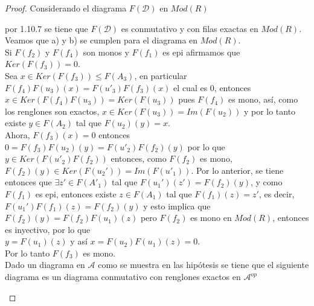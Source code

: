 \documentclass{article}
\begin{document}
\begin{enumerate}[label=\textbf{Ej \arabic*.}]
\begin{proof}
Considerando el diagrama $F(\mathscr{D})$ en $Mod(R)$

\centerline{
}

por 1.10.7 se tiene que $F(\mathscr{D})$ es conmutativo y con filas exactas en $Mod(R)$.\\
Veamos que a) y b) se cumplen para el diagrama en $Mod(R)$.\\

 Si $F(f_2)$ y $F(f_4)$ son monos y $F(f_1)$ es epi afirmamos que \\$Ker(F(f_3))=0$.\\

Sea $x\in Ker(F(f_3))\leq F(A_3)$, en particular $F(f_4)F(u_3)(x)=F(u'_3)F(f_3)(x)$ el cual es $0$, entonces $x\in Ker(F(f_4)F(u_3))=Ker(F(u_3))$ pues 
$F(f_4)$ es mono, así, como los renglones son exactos, $x\in Ker(F(u_3))=Im(F(u_2))$ y por lo tanto existe $y\in F(A_2)$ tal que $F(u_2)(y)=x$.\\

Ahora, $F(f_3)(x)=0$ entonces $0=F(f_3)F(u_2)(y)=F(u'_2)F(f_2)(y)$ por lo que $y\in Ker(F(u'_2)F(f_2))$ entonces, como $F(f_2)$ es mono,\\
$F(f_2)(y)\in Ker(F(u_2'))=Im(F(u'_1)).$ Por lo anterior, se tiene entonces que $\exists z'\in F(A'_1)$ tal que $F(u_1')(z')=F(f_2)(y)$, y como 
$F(f_1)$ es epi, entonces existe $z\in F(A_1)$ tal que $F(f_1)(z)=z'$, es decir, \\$F(u_1')F(f_1)(z)=F(f_2)(y)$ y esto implica que $F(f_2)(y)
=F(f_2)F(u_1)(z)$ pero $F(f_2)$ es mono en $Mod(R)$, entonces es inyectivo, por lo que \\$y=F(u_1)(z)$ y así $x=F(u_2)F(u_1)(z)=0$.\\
Por lo tanto $F(f_3)$ es mono.\\

 Dado un diagrama en $\mathscr{A}$ como se muestra en las hipótesis se tiene que el siguiente diagrama es un diagrama conmutativo
con renglones exactos en $\mathscr{A}^{op}$

\centerline{
}


\end{proof}
\end{enumerate}
\end{document}
